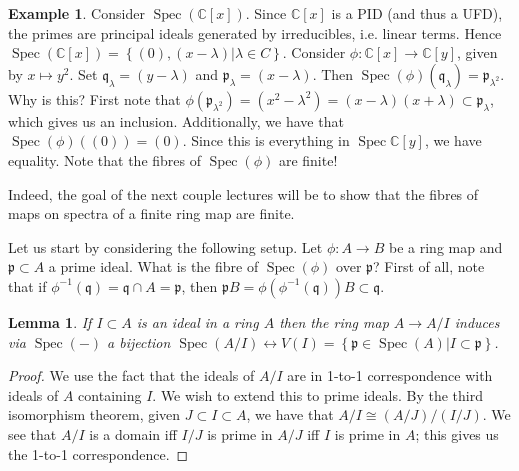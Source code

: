 \documentclass{article}
\newcommand{\C}{\mathbb{C}}
\newcommand{\fr}{\mathfrak}
\DeclareMathOperator{\Spec}{Spec}
\theoremstyle{plain}
\newtheorem{lem}[thm]{Lemma}
\theoremstyle{definition}
\newtheorem{exmp}{Example}
\theoremstyle{remark}
\begin{document}
\begin{exmp}
    Consider $\Spec(\C[x])$. Since $\C[x]$ is a PID (and thus a UFD), the primes are principal ideals generated by irreducibles, i.e.
    linear terms. Hence $\Spec(\C[x])=\left\{ (0),(x-\lambda) | \lambda\in C \right\}$. Consider $\phi:\C[x]\to\C[y]$, given by $x\mapsto y^2$.
    Set $\fr q_\lambda=(y-\lambda)$ and $\fr p_\lambda=(x-\lambda)$. Then $\Spec(\phi)(\fr q_\lambda)=\fr p_{\lambda^2}$. Why is this? 
    First note that $\phi(\fr p_{\lambda^2})=(x^2-\lambda^2)=(x-\lambda)(x+\lambda)\subset\fr p_\lambda$, which gives us an inclusion.
    Additionally, we have that $\Spec(\phi)\left( (0) \right)=(0)$. Since this is everything in $\Spec\C[y]$, we have equality.  Note that the fibres of $\Spec(\phi)$ are finite!
\end{exmp}

Indeed, the goal of the next couple lectures will be to show that the fibres of maps on spectra of a finite ring map are finite.

Let us start by considering the following setup. Let $\phi: A\to B$ be a ring map and $\fr p\subset A$ a prime ideal. What is the fibre of $\Spec(\phi)$ over $\fr p$? First of all, note that if $\phi^{-1}(\fr q)=\fr q\cap A=\fr p$, then $\fr p B=\phi(\phi^{-1}(\fr q))B\subset\fr q$.

\begin{lem}
\label{L5}
    If $I\subset A$ is an ideal in a ring $A$ then the ring map $A\to A/I$ induces via $\Spec(-)$ a bijection $\Spec(A/I)\leftrightarrow V(I)=\left\{ \fr p\in\Spec(A) | I\subset \fr p \right\}$.
\end{lem}
\begin{proof}
    We use the fact that the ideals of $A/I$ are in 1-to-1 correspondence with ideals of $A$ containing $I$. We wish to extend this to prime ideals. By the third isomorphism theorem, given $J\subset I\subset A$, we have that $A/I\cong(A/J)/(I/J)$. We see that $A/I$ is a domain iff $I/J$ is prime in $A/J$ iff $I$ is prime in $A$; this gives us the 1-to-1 correspondence.
\end{proof}
\end{document}
